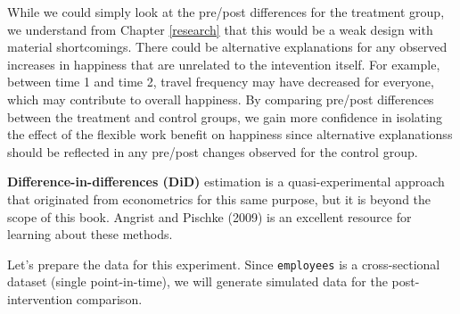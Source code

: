 \documentclass[]{book}
\begin{document}
While we could simply look at the pre/post differences for the treatment group, we understand from Chapter \ref{research} that this would be a weak design with material shortcomings. There could be alternative explanations for any observed increases in happiness that are unrelated to the intevention itself. For example, between time 1 and time 2, travel frequency may have decreased for everyone, which may contribute to overall happiness. By comparing pre/post differences between the treatment and control groups, we gain more confidence in isolating the effect of the flexible work benefit on happiness since alternative explanationss should be reflected in any pre/post changes observed for the control group.

\textbf{Difference-in-differences (DiD)} estimation is a quasi-experimental approach that originated from econometrics for this same purpose, but it is beyond the scope of this book. Angrist and Pischke (2009) is an excellent resource for learning about these methods.

Let's prepare the data for this experiment. Since \texttt{employees} is a cross-sectional dataset (single point-in-time), we will generate simulated data for the post-intervention comparison.
\end{document}
